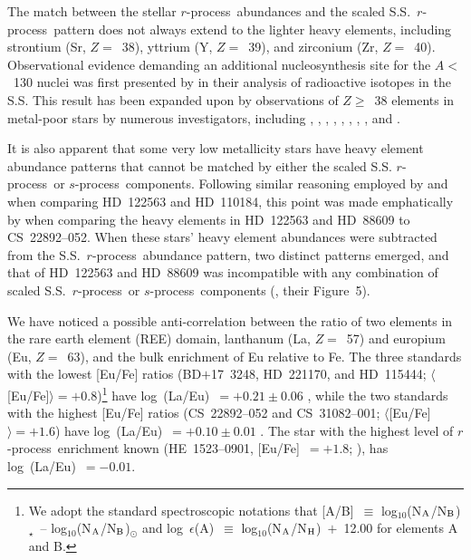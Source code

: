 \documentclass{emulateapj}
\def\rpro{\mbox{$r$-process}}
\def\spro{\mbox{$s$-process}}
\begin{document}
The match between the stellar \rpro\ abundances and 
the scaled S.S.\ \rpro\ pattern does not always extend to the lighter
heavy elements, including strontium (Sr, $Z =$~38), 
yttrium (Y, $Z =$~39), and zirconium (Zr, $Z =$~40).
Observational evidence demanding an additional 
nucleosynthesis site for the $A <$~130 nuclei
was first presented by \citet{wasserburg96} in their analysis
of radioactive isotopes in the S.S.
This result has been expanded upon by
observations of $Z \geq$~38 elements in metal-poor stars by
numerous investigators, including
\citet{mcwilliam98}, \citet{burris00,burris09},
\citet{johnson02b}, \citet{aoki05}, \citet{barklem05},
\citet{francois07}, \citet{cohen08}, \citet{lai08}, and
\citet{mashonkina08}.

It is also apparent that some very low
metallicity stars have heavy element abundance patterns that cannot be 
matched by either the scaled S.S. \rpro\ or \spro\ components.
Following similar reasoning employed by \citet{sneden83} 
and \citet{sneden85} 
when comparing \mbox{HD~122563} and \mbox{HD~110184},
this point was made emphatically by \citet{honda06,honda07}
when comparing the heavy elements in
\mbox{HD~122563} and \mbox{HD~88609} to \mbox{CS~22892--052}.
When these stars' heavy element abundances were subtracted from
the S.S.\ \rpro\ abundance pattern, two distinct patterns emerged,
and that of \mbox{HD~122563} and \mbox{HD~88609} was incompatible
with any combination of scaled S.S.\ \rpro\ or \spro\ components
(\citealt{honda07}, their Figure~5).

We have noticed a possible anti-correlation
between the ratio of two elements in the rare earth element (REE)
domain, lanthanum (La, $Z =$~57) and europium (Eu, $Z =$~63),
and the bulk enrichment of Eu relative to Fe.
The three standards with the lowest [Eu/Fe] ratios
(\mbox{BD$+$17~3248}, \mbox{HD~221170}, and \mbox{HD~115444};
$\langle$[Eu/Fe]$\rangle = +0.8$)\footnote{
We adopt the standard spectroscopic notations that
[A/B]~$\equiv$ log$_{10}$(N$_{\rm A}$/N$_{\rm B}$)$_{\star}$~--
log$_{10}$(N$_{\rm A}$/N$_{\rm B}$)$_{\odot}$ and
log~$\epsilon$(A)~$\equiv$ 
log$_{10}$(N$_{\rm A}$/N$_{\rm H}$)~$+$~12.00
for elements A and B.} 
have log~(La/Eu)~$= +0.21 \pm 0.06$ \citep{sneden09}, while the 
two standards with the highest [Eu/Fe] ratios
(\mbox{CS~22892--052} and \mbox{CS~31082--001};
$\langle$[Eu/Fe]$\rangle = +1.6$) have
log~(La/Eu)~$= +0.10 \pm 0.01$ \citep{sneden09}.
The star with the highest level of \rpro\ enrichment known
(\mbox{HE~1523--0901}, [Eu/Fe]~$=+1.8$; \citealt{frebel07}),
has log~(La/Eu)~$= -0.01$.
\end{document}
